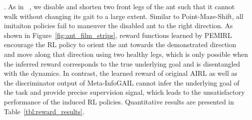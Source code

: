 . As in ~\citet{fu2017learning}, we disable and shorten two front legs of the ant such that it cannot walk without changing its gait to a large extent. Similar to Point-Maze-Shift, all imitaiton policies fail to maneuver the disabled ant to the right direction. As shown in Figure~\ref{fig:ant_film_strips}, reward functions learned by PEMIRL encourage the RL policy to orient the ant towards the demonstrated direction and move along that direction using two healthy legs, which is only possible when the inferred reward corresponds to the true underlying goal and is disentangled with the dynamics. In contrast, the learned reward of original AIRL as well as the discriminator output of Meta-InfoGAIL cannot infer the underlying goal of the task and provide precise supervision signal, which leads to the unsatisfactory performance of the induced RL policies. Quantitative results are presented in Table~\ref{tbl:reward_results}.















%